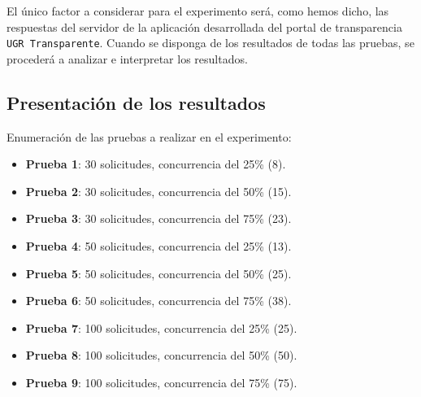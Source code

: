 \bigskip
El único factor a considerar para el experimento será, como hemos
dicho, las respuestas del servidor de la aplicación desarrollada del
portal de transparencia {\tt UGR Transparente}. Cuando se disponga de
los resultados de todas las pruebas, se procederá a analizar e
interpretar los resultados. %

\subsection{Presentación de los resultados}

Enumeración de las pruebas a realizar en el experimento:

\begin{itemize}
	\item \textbf{Prueba 1}: 30 solicitudes, concurrencia del 25\% (8).
	\item \textbf{Prueba 2}: 30 solicitudes, concurrencia del 50\% (15).
	\item \textbf{Prueba 3}: 30 solicitudes, concurrencia del 75\% (23).
	\item \textbf{Prueba 4}: 50 solicitudes, concurrencia del 25\% (13).
	\item \textbf{Prueba 5}: 50 solicitudes, concurrencia del 50\% (25).
	\item \textbf{Prueba 6}: 50 solicitudes, concurrencia del 75\% (38).
	\item \textbf{Prueba 7}: 100 solicitudes, concurrencia del 25\% (25).
	\item \textbf{Prueba 8}: 100 solicitudes, concurrencia del 50\% (50).
	\item \textbf{Prueba 9}: 100 solicitudes, concurrencia del 75\% (75).
\end{itemize}

